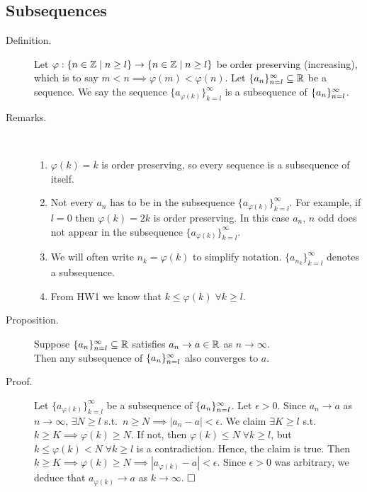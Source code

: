 \documentclass[letterpaper,11pt]{article}
\begin{document}

\subsection{Subsequences}

\begin{description}
\item[Definition.] Let $\varphi:\{n\in\mathbb{Z}\;|\;n\ge l\}\to
    \{n\in\mathbb{Z}\;|\;n\ge l\}$ be order preserving (increasing),
    which is to say $m<n\implies \varphi(m)<\varphi(n)$.
    Let $\{a_n\}_{n=l}^\infty\subseteq\mathbb{R}$ be a sequence. We say the sequence
    $\{a_{\varphi(k)}\}_{k=l}^\infty$ is a subsequence of $\{a_n\}_{n=l}^\infty$.

\item[Remarks.]\text{}\vspace{-0.2in}\\
  \begin{enumerate}[1)]
  \item $\varphi(k)=k$ is order preserving, so every sequence
      is a subsequence of itself.
  \item Not every $a_n$ has to be in the subsequence
      $\{a_{\varphi(k)}\}_{k=l}^\infty$. For example, if $l=0$
      then $\varphi(k)=2k$ is order preserving. In this case $a_n$,
      $n$ odd does not appear in the subsequence
      $\{a_{\varphi(k)}\}_{k=l}^\infty$.
  \item We will often write $n_k=\varphi(k)$ to simplify notation.
      $\{a_{n_k}\}_{k=l}^\infty$ denotes a subsequence.
  \item From HW1 we know that $k\le \varphi(k)\;\forall k\ge l$.
  \end{enumerate}


\item[Proposition.] Suppose $\{a_n\}_{n=l}^\infty\subseteq\mathbb{R}$ satisfies
    $a_n\to a\in\mathbb{R}$ as $n\to\infty$.\\
    Then any subsequence of $\{a_n\}_{n=l}^\infty$ also converges to $a$.

\item[Proof.] Let $\{a_{\varphi(k)}\}_{k=l}^\infty$ be a subsequence
    of $\{a_n\}_{n=l}^\infty$. Let $\epsilon>0$. Since $a_n\to a$ as $n\to \infty$,
    $\exists N\ge l$ s.t.\ $n\ge N\implies |a_n-a|<\epsilon$.
    We claim $\exists K\ge l$ s.t.\ $k\ge K\implies \varphi(k)\ge N$.
    If not, then $\varphi(k)\le N\;\forall k\ge l$, but
    $k\le \varphi(k)<N\;\forall k\ge l$ is a contradiction.
    Hence, the claim is true.  Then
    $k\ge K\implies \varphi(k)\ge N\implies |a_{\varphi(k)}-a|<\epsilon$.
    Since $\epsilon>0$ was arbitrary, we deduce that $a_{\varphi(k)}\to a$
    as $k\to\infty$. $\hfill\square$


\end{description}
\end{document}
